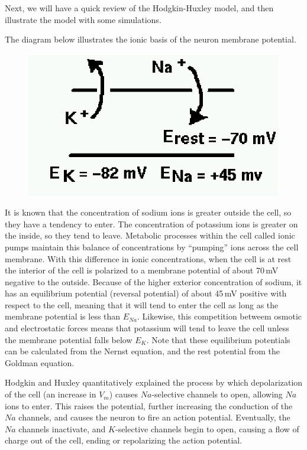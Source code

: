 \documentclass[12pt]{article}
\begin{document}
Next, we will have a quick review of the Hodgkin-Huxley model, and then illustrate the model with some simulations.

The diagram below illustrates the ionic basis of the neuron membrane potential.

\begin{figure}[h]
  \centering
 \includegraphics[scale=0.75]{figs/ionflow.eps}
  \label{fig:ionflow}
\end{figure}

It is known that the concentration of sodium ions is greater outside the cell, so they have a tendency to enter. The concentration of potassium ions is greater on the inside, so they tend to leave. Metabolic processes within the cell called ionic pumps maintain this balance of concentrations by ``pumping'' ions across the cell membrane. With this difference in ionic concentrations,  when the cell is at rest the interior of the cell is polarized to a membrane potential of about 70\,mV negative to the outside. Because of the higher exterior concentration of sodium, it has an equilibrium potential (reversal potential) of about 45\,mV positive with respect to the cell, meaning that it will tend to enter the cell as long as the membrane potential is less than $E_{Na}$. Likewise, this competition betweem osmotic and electrostatic forces means that potassium will tend to leave the cell unless the membrane potential falls below $E_K$. Note that these equilibrium potentials can be calculated from the Nernst equation, and the rest potential from the Goldman equation.

Hodgkin and Huxley quantitatively explained the process by which depolarization of the cell (an increase in $V_m$) causes $Na$-selective channels to open, allowing $Na$ ions to enter. This raises the potential, further increasing the conduction of the $Na$ channels, and causes the neuron to fire an action potential. Eventually, the $Na$ channels inactivate, and $K$-selective channels begin to open, causing a flow of charge out of the cell, ending or repolarizing the action potential.
\end{document}
